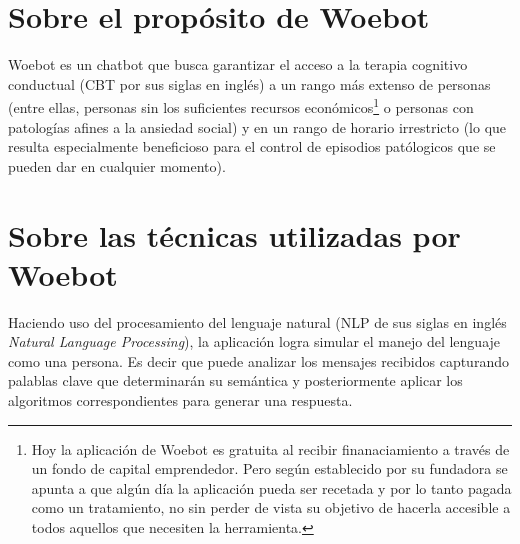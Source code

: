 \documentclass[11pt]{article}
\begin{document}


\section{Sobre el propósito de Woebot}
Woebot es un chatbot que busca garantizar el acceso a la terapia 
cognitivo conductual (CBT por sus siglas en inglés) a 
un rango más extenso de personas (entre ellas, personas 
sin los suficientes recursos económicos\footnotemark[1]\footnote[1]{Hoy la aplicación de Woebot es gratuita 
al recibir finanaciamiento a través de un fondo de 
capital emprendedor. Pero según establecido por su 
fundadora se apunta a que algún día la aplicación 
pueda ser recetada y por lo tanto pagada como un 
tratamiento, no sin perder de vista su objetivo de 
hacerla accesible a todos aquellos que necesiten la 
herramienta.} o personas con 
patologías afines a la ansiedad social) y en un rango 
de horario irrestricto (lo que resulta especialmente 
beneficioso para el control de episodios patólogicos 
que se pueden dar en cualquier momento). 


\section{Sobre las técnicas utilizadas por Woebot}
Haciendo uso del procesamiento del lenguaje natural (NLP de sus siglas en inglés 
\textit{Natural Language Processing}), la aplicación 
logra simular el manejo del lenguaje como una persona. 
Es decir que puede analizar los mensajes recibidos 
capturando 
palablas clave 
que determinarán su semántica
y posteriormente aplicar los
algoritmos correspondientes para generar una respuesta.
\end{document}
